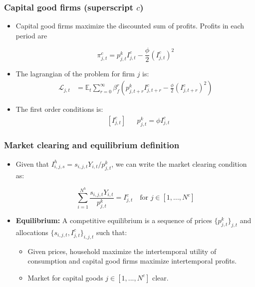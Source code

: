 \documentclass[11pt,english]{article}
\newcommand{\E}{\mathbb{E}}
\begin{document}
\subsubsection{Capital good firms (superscript $c$)}


\begin{itemize}
	
	\item Capital good firms maximize the discounted sum of profits. Profits in each period are
	
	$$\pi^c_{j,t}=p^k_{j,t} I^c_{j,t}-\frac{\phi}{2} \left(I^c_{j,t}\right)^2  $$
	
	
	\item The lagrangian of the problem for firm $j$ is:
	\begin{align*}
	\mathcal{L}_{j,t} &= \E_t \sum_{r=0}^{\infty}\beta^r_f \left(
	p^k_{j,t+r} I^c_{j,t+r}-\frac{\phi}{2} \left(I^c_{j,t+r}\right)^2 \right)
	\end{align*}
	
	\item The first order conditions is:
	\begin{align}
	& \left[I^c_{j,t}\right]&& p^k_{j,t} = \phi I^c_{j,t}
	\end{align}
	
\end{itemize}
\subsubsection{Market clearing and equilibrium definition}

\begin{itemize}
	\item Given that $I^h_{i,j,s} = s_{i,j,t} Y_{i,t} /p^k_{j,t}$, we can write the market clearing condition as:
	
	$$ \sum_{i=1}^{N^h} \frac{ s_{i,j,t} Y_{i,t} }{p^k_{j,t}} = I^c_{j,t} \quad \text{for } j \in [1,...,N^c]$$
	
	\item \textbf{Equilibrium:} A competitive equilibrium is a sequence of prices $\{p^k_{j,t}\}_{j,t}$ and allocations $\{s_{i,j,t}, I^c_{j,t} \}_{i,j,t}$ such that:
	
	\begin{itemize}
		\item Given prices, household maximize the intertemporal utility of consumption and capital good firms maximize intertemporal profits.
		
		\item Market for capital goods $j \in [1,...,N^c]$ clear.
	\end{itemize}
	
\end{itemize}
\end{document}

